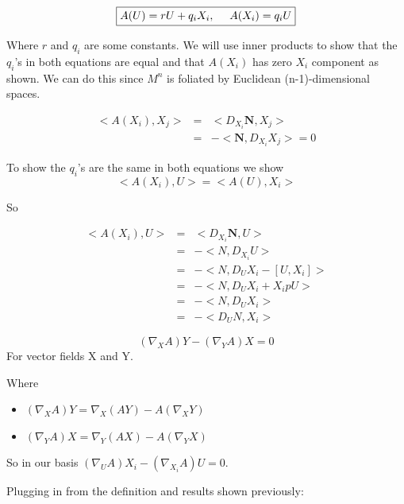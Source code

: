 \begin{equation}
\framebox{$A(U) = rU + q_i X_i, \ \ \ \ A (X_i) = q_i U$}
\label{Weingarten}
\end{equation}

Where $r$ and $q_i$ are some constants. We will use inner products to show that the $q_i$'s in both equations are equal and that $A(X_i)$ has zero $X_i$ component as shown. We can do this since $M^n$ is foliated by Euclidean (n-1)-dimensional spaces.

\begin{eqnarray}
\nonumber
<A(X_i), X_j> &=& <D_{X_i} \mathbf N, X_j> \\
\nonumber
&=& -<\mathbf N, D_{X_i}X_j> = 0
\end{eqnarray}

To show the $q_i$'s are the same in both equations we show
\begin{displaymath}
<A(X_i), U> = <A(U),X_i>
\end{displaymath}

So

\begin{eqnarray}
\nonumber
<A(X_i), U> &=& <D_{X_i} \mathbf N, U> \\
\nonumber
&=& -<N, D_{X_i}U> \\
\nonumber 
&=& -<N, D_U X_i - [U,X_i]>\\
\nonumber
&=& -<N, D_U X_i + X_i p U>\\
\nonumber
&=& -<N, D_U X_i>\\
\nonumber
&=& -<D_U N, X_i>
\end{eqnarray}

\begin{definition}
\begin{displaymath}
(\nabla_X A)Y - (\nabla_{Y} A)X = 0
\end{displaymath}
For vector fields X and Y.

Where 
\begin{itemize}
	\item $(\nabla_X A) Y = \nabla_X(AY) - A(\nabla_X Y)$
	\item $(\nabla_Y A) X = \nabla_Y(AX) - A(\nabla_Y X)$
\end{itemize}
\end{definition}

So in our basis $(\nabla_U A) X_i - (\nabla_{X_i} A) U = 0$.

Plugging in from the definition and results shown previously:

